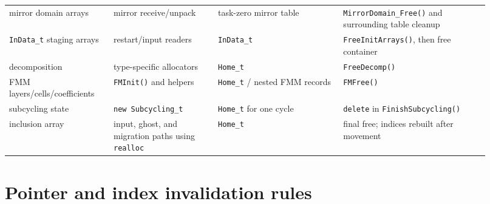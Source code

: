 \documentclass[11pt]{article}
\newcommand{\code}[1]{\texorpdfstring{\nolinkurl{#1}}{#1}}
\begin{document}
\begin{longtable}{@{}p{0.20\linewidth}p{0.20\linewidth}p{0.24\linewidth}p{0.28\linewidth}@{}}
mirror domain arrays & mirror receive/unpack & task-zero mirror table &
\code{MirrorDomain_Free()} and surrounding table cleanup \\
\code{InData_t} staging arrays & restart/input readers & \code{InData_t} &
\code{FreeInitArrays()}, then free container \\
decomposition & type-specific allocators & \code{Home_t} & \code{FreeDecomp()} \\
FMM layers/cells/coefficients & \code{FMInit()} and helpers & \code{Home_t} /
nested FMM records & \code{FMFree()} \\
subcycling state & \code{new Subcycling_t} & \code{Home_t} for one cycle &
\code{delete} in \code{FinishSubcycling()} \\
inclusion array & input, ghost, and migration paths using \code{realloc} &
\code{Home_t} & final free; indices rebuilt after movement \\
\bottomrule
\end{longtable}
\normalsize

\section{Pointer and index invalidation rules}
\end{document}
